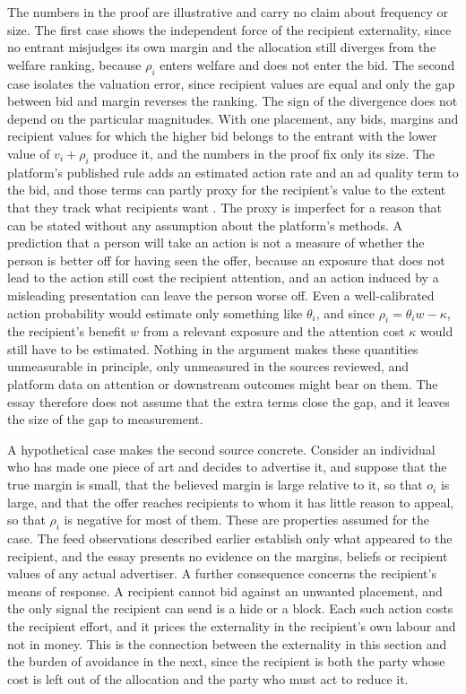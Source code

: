 \documentclass[11pt]{article}
\theoremstyle{definition}
\begin{document}
The numbers in the proof are illustrative and carry no claim about frequency or size. The first case shows the independent force of the recipient externality, since no entrant misjudges its own margin and the allocation still diverges from the welfare ranking, because $\rho_i$ enters welfare and does not enter the bid. The second case isolates the valuation error, since recipient values are equal and only the gap between bid and margin reverses the ranking. The sign of the divergence does not depend on the particular magnitudes. With one placement, any bids, margins and recipient values for which the higher bid belongs to the entrant with the lower value of $v_i+\rho_i$ produce it, and the numbers in the proof fix only its size. The platform's published rule adds an estimated action rate and an ad quality term to the bid, and those terms can partly proxy for the recipient's value to the extent that they track what recipients want \cite{metaauction,instaml}. The proxy is imperfect for a reason that can be stated without any assumption about the platform's methods. A prediction that a person will take an action is not a measure of whether the person is better off for having seen the offer, because an exposure that does not lead to the action still cost the recipient attention, and an action induced by a misleading presentation can leave the person worse off. Even a well-calibrated action probability would estimate only something like $\theta_i$, and since $\rho_i=\theta_i w-\kappa$, the recipient's benefit $w$ from a relevant exposure and the attention cost $\kappa$ would still have to be estimated. Nothing in the argument makes these quantities unmeasurable in principle, only unmeasured in the sources reviewed, and platform data on attention or downstream outcomes might bear on them. The essay therefore does not assume that the extra terms close the gap, and it leaves the size of the gap to measurement.

A hypothetical case makes the second source concrete. Consider an individual who has made one piece of art and decides to advertise it, and suppose that the true margin is small, that the believed margin is large relative to it, so that $o_i$ is large, and that the offer reaches recipients to whom it has little reason to appeal, so that $\rho_i$ is negative for most of them. These are properties assumed for the case. The feed observations described earlier establish only what appeared to the recipient, and the essay presents no evidence on the margins, beliefs or recipient values of any actual advertiser. A further consequence concerns the recipient's means of response. A recipient cannot bid against an unwanted placement, and the only signal the recipient can send is a hide or a block. Each such action costs the recipient effort, and it prices the externality in the recipient's own labour and not in money. This is the connection between the externality in this section and the burden of avoidance in the next, since the recipient is both the party whose cost is left out of the allocation and the party who must act to reduce it.
\end{document}
